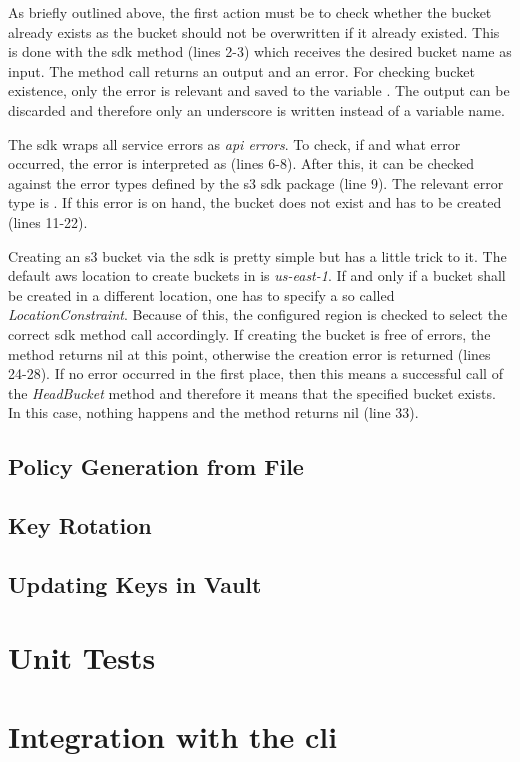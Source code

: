 As briefly outlined above, the first action must be to check whether the bucket already exists as the bucket should not be overwritten if it already existed.
This is done with the \ac{sdk} method  (lines 2-3) which receives the desired bucket name as input.
The method call returns an output and an error.
For checking bucket existence, only the error is relevant and saved to the variable .
The output can be discarded and therefore only an underscore is written instead of a variable name.

The \ac{sdk} wraps all service errors as \emph{\ac{api} errors}.
To check, if and what error occurred, the error is interpreted as  (lines 6-8).
After this, it can be checked against the error types defined by the \ac{s3} \ac{sdk} package (line 9).
The relevant error type is .
If this error is on hand, the bucket does not exist and has to be created (lines 11-22).

Creating an \ac{s3} bucket via the \ac{sdk} is pretty simple but has a little trick to it.
The default \ac{aws} location to create buckets in is \emph{us-east-1}.
If and only if a bucket shall be created in a different location, one has to specify a so called \emph{LocationConstraint}.
Because of this, the configured region is checked to select the correct \ac{sdk} method call accordingly.
If creating the bucket is free of errors, the method returns nil at this point, otherwise the creation error is returned (lines 24-28).
If no error occurred in the first place, then this means a successful call of the \emph{HeadBucket} method and therefore it means that the specified bucket exists.
In this case, nothing happens and the method returns nil (line 33).



\subsection{Policy Generation from File}
\subsection{Key Rotation}
\subsection{Updating Keys in Vault}

\section{Unit Tests}

\section{Integration with the \ac{cli}}